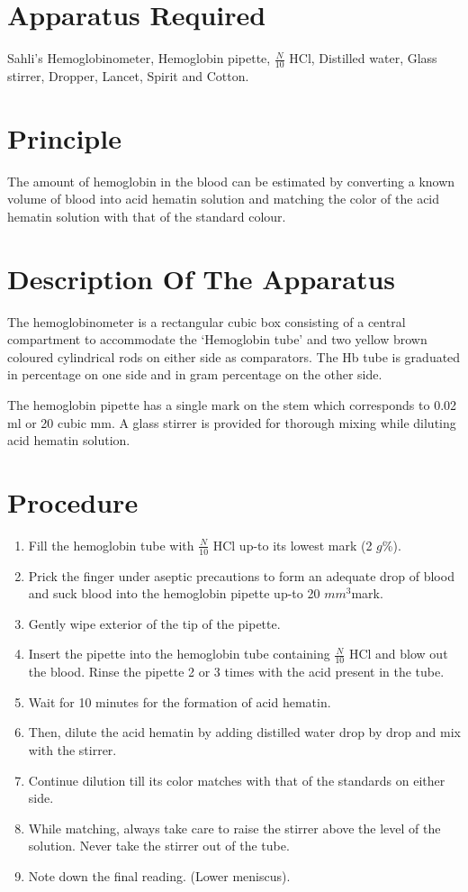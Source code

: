 \documentclass[a4paper,12pt]{book}
\begin{document}
								\section*{Apparatus Required}
								Sahli’s Hemoglobinometer, Hemoglobin pipette, $\frac{N}{10}$ HCl, Distilled water, Glass stirrer, Dropper, Lancet, Spirit and Cotton.
								\section*{Principle}
								The amount of hemoglobin in the blood can be estimated by converting a known volume of blood into acid hematin solution and matching the color of the acid hematin solution with that of the standard colour.
								\section*{Description Of The Apparatus}
								The hemoglobinometer is a rectangular cubic box consisting of a central compartment to accommodate the ‘Hemoglobin tube’ and two yellow brown coloured cylindrical rods on either side as comparators. The Hb tube is graduated in percentage on one side and in gram percentage on the other side.

								The hemoglobin pipette has a single mark on the stem which corresponds to 0.02 ml or 20 cubic mm. A glass stirrer is provided for thorough mixing while diluting acid hematin solution.
								\section*{Procedure}
								\begin{enumerate}
									\item{Fill the hemoglobin tube with $\frac{N}{10}$ HCl up-to its lowest mark (2 $g$\%).}
									\item{Prick the finger under aseptic precautions to form an adequate drop of blood and suck blood into the hemoglobin pipette up-to 20 $mm^{3}$mark.}
									\item{Gently wipe exterior of the tip of the pipette.}
									\item{Insert the pipette into the hemoglobin tube containing $\frac{N}{10}$ HCl and blow out the blood. Rinse the pipette 2 or 3 times with the acid present in the tube.}
									\item{Wait for 10 minutes for the formation of acid hematin.}
									\item{Then, dilute the acid hematin by adding distilled water drop by drop and mix with the stirrer.}
									\item{Continue dilution till its color matches with that of the standards on either side.}
									\item{While matching, always take care to raise the stirrer above the level of the solution. Never take the stirrer out of the tube.}
									\item{Note down the final reading. (Lower meniscus).}
								\end{enumerate}
\end{document}
